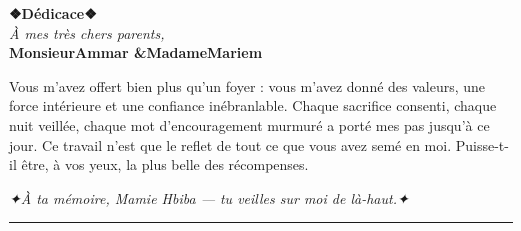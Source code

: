\thispagestyle{empty}
\vspace*{2cm}

{\centering
  {\Large\bfseries\color{smartblue} ❖\quad Dédicace\quad ❖}\\[1.8cm]

  {\large\itshape\color{smartblue} À mes très chers parents,}\\[0.4cm]

  {\large\bfseries\color{smartblue}
    Monsieur\quad Ammar \quad \&\quad Madame\quad Mariem}\\[1cm]
}

\begin{onehalfspace}
\color{black}
Vous m'avez offert bien plus qu'un foyer : vous m'avez donné des valeurs,
une force intérieure et une confiance inébranlable. Chaque sacrifice consenti,
chaque nuit veillée, chaque mot d'encouragement murmuré a porté mes pas
jusqu'à ce jour. Ce travail n'est que le reflet de tout ce que vous avez semé
en moi. Puisse-t-il être, à vos yeux, la plus belle des récompenses.
\end{onehalfspace}

\vspace{1.2cm}

{\centering
  {\small\itshape\color{smartgray}
    ✦\enspace À ta mémoire, Mamie Hbiba — tu veilles sur moi de là-haut.\enspace ✦}\\[1.2cm]
}

{\centering
  \textcolor{tableborder}{\rule{8cm}{0.4pt}}\\[0.3cm]
}

